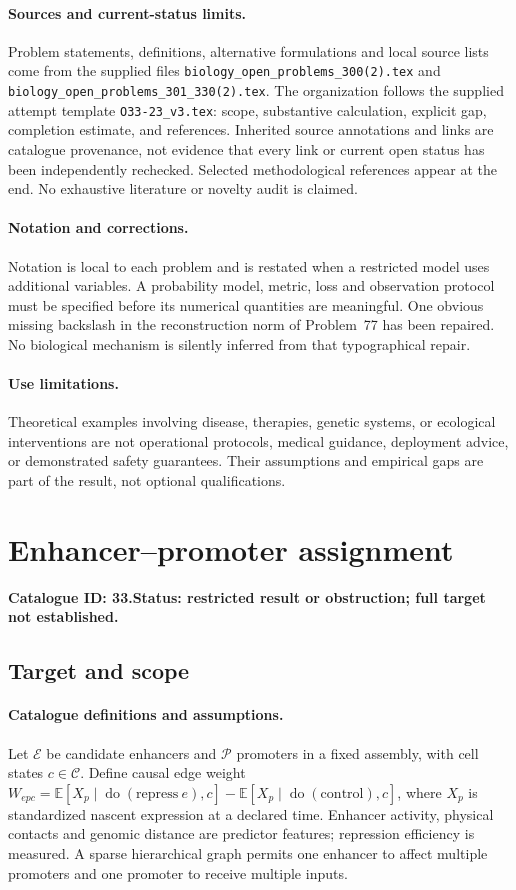 \documentclass[11pt]{article}
\newcommand{\E}{\mathbb E}
\providecommand{\E}{\mathbb E}
\begin{document}
\paragraph{Sources and current-status limits.}
Problem statements, definitions, alternative formulations and local source lists
come from the supplied files
\texttt{biology\_open\_problems\_300(2).tex} and
\texttt{biology\_open\_problems\_301\_330(2).tex}.
The organization follows the supplied attempt template
\texttt{O33-23\_v3.tex}: scope, substantive calculation, explicit gap,
completion estimate, and references. Inherited source annotations and links are
catalogue provenance, not evidence that every link or current open status has
been independently rechecked. Selected methodological references appear at the
end. No exhaustive literature or novelty audit is claimed.

\paragraph{Notation and corrections.}
Notation is local to each problem and is restated when a restricted model uses
additional variables. A probability model, metric, loss and observation protocol
must be specified before its numerical quantities are meaningful. One obvious
missing backslash in the reconstruction norm of Problem~77 has been repaired.
No biological mechanism is silently inferred from that typographical repair.

\paragraph{Use limitations.}
Theoretical examples involving disease, therapies, genetic systems, or ecological
interventions are not operational protocols, medical guidance, deployment advice,
or demonstrated safety guarantees. Their assumptions and empirical gaps are part
of the result, not optional qualifications.

\setcounter{section}{32}
\section{Enhancer--promoter assignment}
\label{prob:033}
\noindent\textbf{Catalogue ID: 33.}\quad \textbf{Status: restricted result or obstruction; full target not established.}
\subsection{Target and scope}
\paragraph{Catalogue definitions and assumptions.}
Let $\mathcal E$ be candidate enhancers and $\mathcal P$ promoters in a fixed assembly, with cell states $c\in\mathcal C$. Define causal edge weight $W_{epc}=\E[X_p\mid\operatorname{do}(\mathrm{repress}\ e),c]-\E[X_p\mid\operatorname{do}(\mathrm{control}),c]$, where $X_p$ is standardized nascent expression at a declared time. Enhancer activity, physical contacts and genomic distance are predictor features; repression efficiency is measured. A sparse hierarchical graph permits one enhancer to affect multiple promoters and one promoter to receive multiple inputs.
\end{document}
